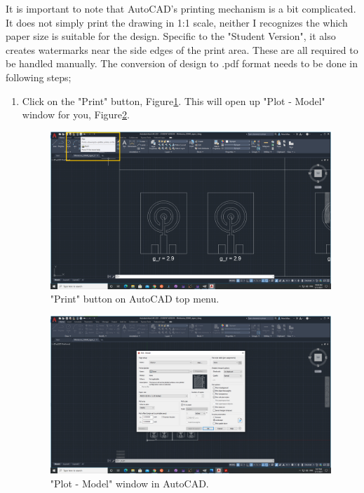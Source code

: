 It is important to note that AutoCAD's printing mechanism is a bit complicated. It does not
simply print the drawing in 1:1 scale, neither I recognizes the which paper size is suitable
for the design. Specific to the "Student Version", it also creates watermarks near the side edges
of the print area. These are all required to be handled manually. The conversion of design to .pdf 
format needs to be done in following steps;

\begin{enumerate}
	
	\item Click on the "Print" button, Figure\ref{fig:PrintButton}. This will open up "Plot - Model" window for you,
	Figure\ref{fig:PlotModelWindow}.

	\begin{figure}[H]
		\centering
		\includegraphics[angle=0,origin=c,width = .8\linewidth]{Section_ODMR_Antenna/Figures/PrintButton.png}
		\caption{"Print" button on AutoCAD top menu.}
		\label{fig:PrintButton}
	\end{figure}
	
	\begin{figure}[H]
		\centering
		\includegraphics[angle=0,origin=c,width = .8\linewidth]{Section_ODMR_Antenna/Figures/PlotModelWindow.png}
		\caption{"Plot - Model" window in AutoCAD.}
		\label{fig:PlotModelWindow}
	\end{figure}


\end{enumerate}
